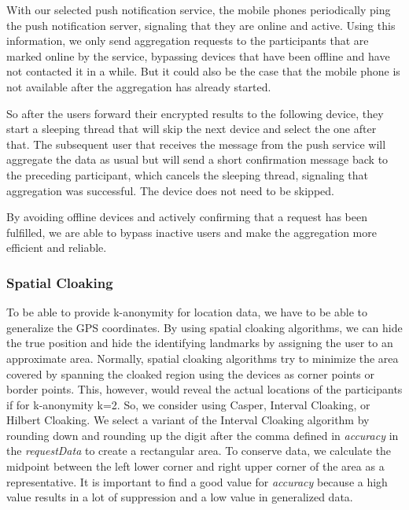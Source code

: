 With our selected push notification service, the mobile phones periodically ping the push notification server, signaling that they are online and active. Using this information, we only send aggregation requests to the participants that are marked online by the service, bypassing devices that have been offline and have not contacted it in a while. But it could also be the case that the mobile phone is not available after the aggregation has already started.

So after the users forward their encrypted results to the following device, they start a sleeping thread that will skip the next device and select the one after that. The subsequent user that receives the message from the push service will aggregate the data as usual but will send a short confirmation message back to the preceding participant, which cancels the sleeping thread, signaling that aggregation was successful. The device does not need to be skipped.

By avoiding offline devices and actively confirming that a request has been fulfilled, we are able to bypass inactive users and make the aggregation more efficient and reliable.

\subsubsection{Spatial Cloaking}
To be able to provide k-anonymity for location data, we have to be able to generalize the GPS coordinates. By using spatial cloaking algorithms, we can hide the true position and hide the identifying landmarks by assigning the user to an approximate area. Normally, spatial cloaking algorithms try to minimize the area covered by spanning the cloaked region using the devices as corner points or border points. This, however, would reveal the actual locations of the participants if for k-anonymity k=2. So, we consider using Casper, Interval Cloaking, or Hilbert Cloaking. We select a variant of the Interval Cloaking algorithm by rounding down and rounding up the digit after the comma defined in \textit{accuracy} in the \textit{requestData} to create a rectangular area. To conserve data, we calculate the midpoint between the left lower corner and right upper corner of the area as a representative. It is important to find a good value for \textit{accuracy} because a high value results in a lot of suppression and a low value in generalized data. 

